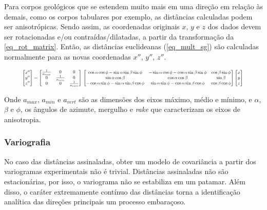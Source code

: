 Para corpos geológicos que se estendem muito mais em uma direção em relação às demais, como os corpos tabulares por exemplo, as distâncias calculadas podem ser anisotrópicas. Sendo assim, as coordenadas originais $x$, $y$ e $z$ dos dados devem ser rotacionadas e/ou contraídas/dilatadas, a partir da transformação da \autoref{eq_rot_matrix}. Então, as distâncias euclideanas (\autoref{eq_mult_sg}) são calculadas normalmente para as novas coordenadas $x''$, $y''$, $z''$.

\begin{equation}
\resizebox{.9 \textwidth}{!}{%
$
\begin{bmatrix} x'' \\ y'' \\ z'' \end{bmatrix} = \begin{bmatrix} \frac{1}{a_{max}} & 0 & 0 \\ 0 & \frac{1}{a_{min}} & 0 \\ 0 & 0 & \frac{1}{a_{vert}} \end{bmatrix} \\ \begin{bmatrix}\cos\alpha\cos\phi-\sin\alpha\sin\beta\sin\phi & -\sin\alpha\cos\phi-\cos\alpha\sin\beta\sin\phi & \cos\beta\sin\phi \\ \sin\alpha\cos\beta & \cos\alpha\cos\beta & \sin\beta \\ -\cos\alpha\sin\phi-\sin\alpha\sin\beta\cos\phi & \sin\alpha\sin\phi-\cos\alpha\sin\beta\cos\phi & \cos\beta\cos\phi \end{bmatrix} \begin{bmatrix} x \\ y \\ z \end{bmatrix}
$
}
\label{eq_rot_matrix}
\end{equation}

Onde $a_{max}$, $a_{min}$ e $a_{vert}$ são as dimensões dos eixos máximo, médio e mínimo, e $\alpha$, $\beta$ e $\phi$, os ângulos de azimute, mergulho e \textit{rake} que caracterizam os eixos de anisotropia.

\subsubsection{Variografia}

No caso das distâncias assinaladas, obter um modelo de covariância a partir dos variogramas experimentais não é trivial. Distâncias assinaladas não são estacionárias, por isso, o variograma não se estabiliza em um patamar. Além disso, o caráter extremamente contínuo das distâncias torna a identificação analítica das direções principais um processo embaraçoso.

